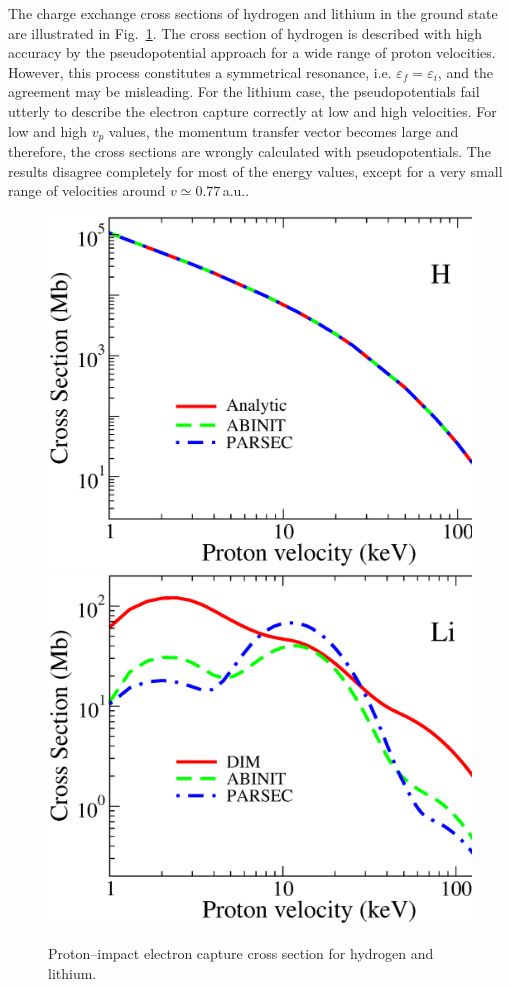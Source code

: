 \documentclass[10pt]{article}
\begin{document}
The charge exchange cross sections of hydrogen and lithium in the 
ground state are illustrated in Fig.~\ref{fig:captureH}. The cross 
section of hydrogen is described with high accuracy by the 
pseudopotential approach for a wide range of proton velocities. 
However, this process constitutes 
a symmetrical resonance, i.e. $\varepsilon_{\!f}=\varepsilon_{\!i}$, 
and the agreement may be misleading. For the lithium case, the 
pseudopotentials fail utterly to describe the electron capture 
correctly at low and high velocities. For low and high $v_p$ values, the 
momentum transfer vector becomes large and therefore, the cross 
sections are wrongly calculated with pseudopotentials. 
The results disagree completely for most of the energy values, except
for a very small range of velocities around $v\simeq0.77$\,a.u..
\begin{figure}[H]
\centering
 \includegraphics[height=0.23\textheight]{figures/pseudopot/captureH.eps}
 \hspace{0.3cm}
 \includegraphics[height=0.23\textheight]{figures/pseudopot/captureLi.eps}
 \caption{Proton--impact electron capture cross section for hydrogen and 
 lithium.}
 \label{fig:captureH}
\end{figure}
\end{document}
